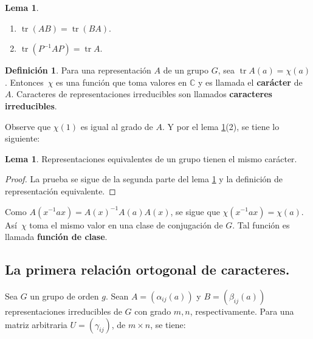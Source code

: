 \documentclass[12pt]{book}
\DeclareMathOperator{\tr}{tr}
\theoremstyle{definition}
\newtheorem{definition}[theorem]{Definición}
\newtheorem{lemma}[theorem]{Lema}
\newcounter{in}
\newcounter{ini}
\begin{document}
\begin{lemma}
   \label{l4_1}
  \begin{enumerate} Para alguna matriz no singular $P$, se sigue que:
  \item $\tr (AB)=\tr (BA) $.
  \item $\tr (P^{-1}AP)=\tr A$.
  \end{enumerate}
\end{lemma}
\begin{definition}
Para una representación $A$ de un grupo $G$, sea $\tr
A(a)=\chi(a)$. Entonces~$\chi$ es una función que toma valores en
$\mathbb{C}$ y es llamada el \textbf{carácter} de~$A$. Caracteres de representaciones
irreducibles son llamados \textbf{caracteres irreducibles}.
\end{definition}
Observe que $\chi(1)$ es igual al grado de $A$. Y por el
lema \ref{l4_1}(2), se tiene lo siguiente:
\begin{lemma}
  \label{l4_2}
  Representaciones equivalentes de un grupo tienen el mismo carácter.
\end{lemma}
\begin{proof}
  La prueba se sigue de la segunda parte del lema \ref{l4_1} y la
  definición de representación equivalente.
\end{proof}
Como $A(x^{-1}ax)=A(x)^{-1}A(a)A(x)$, se sigue que
$ \chi(x^{-1}ax)=\chi(a)$. Así~$\chi$ toma el mismo valor en una clase
de conjugación de $G$. Tal función es llamada \textbf{función de clase}.

\subsection{La primera relación ortogonal de caracteres.}
\label{subsec:roc1}
Sea $G$ un grupo de orden $g$. Sean $A=(\alpha_{ij}(a))$ y
$B=(\beta_{ij}(a))$ representaciones irreducibles de $G$ con grado
$m,n$, respectivamente. Para una matriz arbitraria $U=(\gamma_{ij})$,
de $m \times n$, se tiene:
\end{document}
